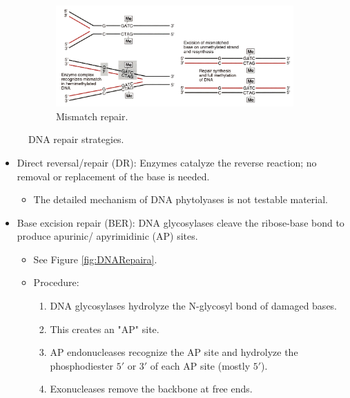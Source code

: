 \documentclass[../notes.tex]{subfiles}
\begin{document}
\begin{itemize}
\begin{figure}[H]
\begin{subfigure}[b]{0.63\linewidth}
            \label{fig:DNARepairb}
        \end{subfigure}
    \end{figure}
    \begin{figure}[H]
        \ContinuedFloat
        \centering
        \begin{subfigure}[b]{0.8\linewidth}
            \centering
            \includegraphics[width=0.9\linewidth]{../ExtFiles/DNARepairc.png}
            \caption{Mismatch repair.}
            \label{fig:DNARepairc}
        \end{subfigure}
        \caption{DNA repair strategies.}
        \label{fig:DNARepair}
    \end{figure}
    \begin{itemize}
        \item Direct reversal/repair (DR): Enzymes catalyze the reverse reaction; no removal or replacement of the base is needed.
        \begin{itemize}
            \item The detailed mechanism of DNA phytolyases is not testable material.
        \end{itemize}
        \item Base excision repair (BER): DNA glycosylases cleave the ribose-base bond to produce apurinic/ apyrimidinic (AP) sites.
        \begin{itemize}
            \item See Figure \ref{fig:DNARepaira}.
            \item Procedure:
            \begin{enumerate}
                \item DNA glycosylases hydrolyze the N-glycosyl bond of damaged bases.
                \item This creates an "AP" site.
                \item AP endonucleases recognize the AP site and hydrolyze the phosphodiester $5'$ or $3'$ of each AP site (mostly $5'$).
                \item Exonucleases remove the backbone at free ends.

\end{enumerate}
\end{itemize}
\end{itemize}
\end{itemize}
\end{document}
